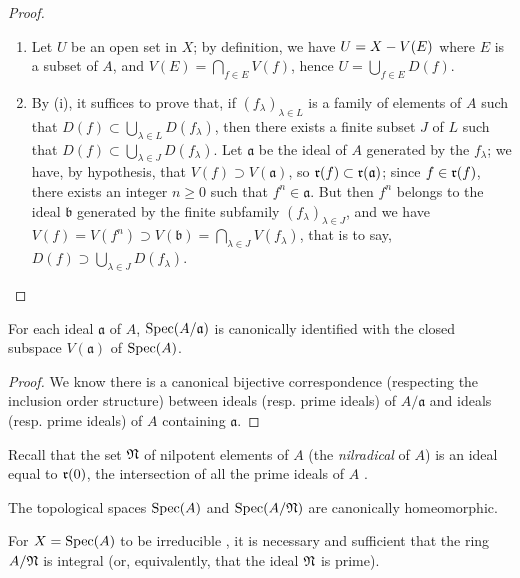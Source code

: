 \begin{proof}
\medskip\noindent
\begin{enumerate}
  \item[(i)] Let $U$ be an open set in $X$;
    by definition, we have $U=X- V(E)$ where $E$ is a subset of $A$, and $V(E)=\bigcap_{f\in E}V(f)$, hence $U=\bigcup_{f\in E}D(f)$.
  \item[(ii)] By (i), it suffices to prove that, if $(f_\lambda)_{\lambda\in L}$ is a family of elements of $A$ such that $D(f)\subset\bigcup_{\lambda\in L}D(f_\lambda)$, then there exists a finite subset $J$ of $L$ such that $D(f)\subset\bigcup_{\lambda\in J}D(f_\lambda)$.
    Let $\mathfrak{a}$ be the ideal of $A$ generated by the $f_\lambda$;
    we have, by hypothesis, that $V(f)\supset V(\mathfrak{a})$, so $\mathfrak{r}(f)\subset\mathfrak{r}(\mathfrak{a})$;
    since $f\in\mathfrak{r}(f)$, there exists an integer $n\geq 0$ such that $f^n\in\mathfrak{a}$.
    But then $f^n$ belongs to the ideal $\mathfrak{b}$ generated by the finite subfamily $(f_\lambda)_{\lambda\in J}$, and we have $V(f)=V(f^n)\supset V(\mathfrak{b})=\bigcap_{\lambda\in J}V(f_\lambda)$, that is to say, $D(f)\supset\bigcup_{\lambda\in J}D(f_\lambda)$.
\end{enumerate}
\end{proof}

\begin{proposition}[1.1.11]
\label{I.1.1.11}
For each ideal $\mathfrak{a}$ of $A$, $\operatorname{Spec}(A/\mathfrak{a})$ is canonically identified with the closed subspace $V(\mathfrak{a})$ of $\operatorname{Spec}(A)$.
\end{proposition}

\begin{proof}
We know there is a canonical bijective correspondence (respecting the inclusion order structure) between ideals (resp. prime ideals) of $A/\mathfrak{a}$ and ideals (resp. prime ideals) of $A$ containing $\mathfrak{a}$.
\end{proof}

Recall that the set $\mathfrak{N}$ of nilpotent elements of $A$ (the \emph{nilradical} of $A$) is an ideal equal to $\mathfrak{r}(0)$, the intersection of all the prime ideals of $A$ .

\begin{corollary}[1.1.12]
\label{I.1.1.12}
The topological spaces $\operatorname{Spec}(A)$ and $\operatorname{Spec}(A/\mathfrak{N})$ are canonically homeomorphic.
\end{corollary}

\begin{proposition}[1.1.13]
\label{I.1.1.13}
For $X=\operatorname{Spec}(A)$ to be irreducible , it is necessary and sufficient that the ring $A/\mathfrak{N}$ is integral (or, equivalently, that the ideal $\mathfrak{N}$ is prime).
\end{proposition}

